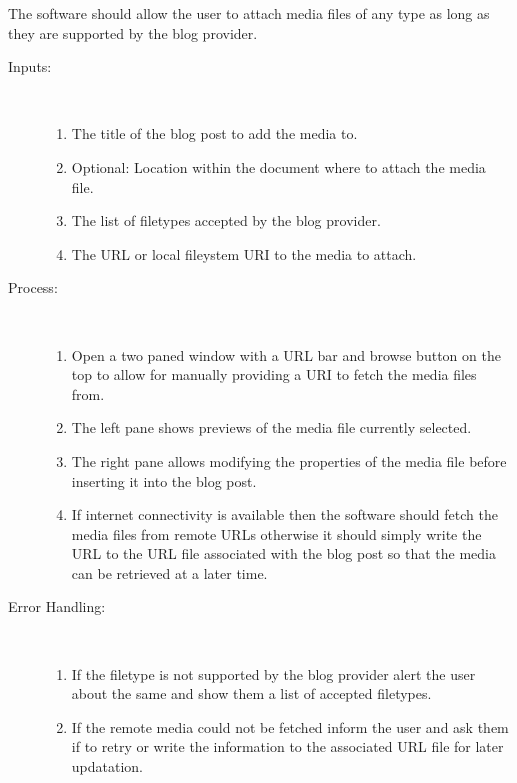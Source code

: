 
The software should allow the user to attach media files of any type as long as they are supported by the blog provider.

\begin{description}
    \item [Inputs:] ~
    \begin{enumerate}[noitemsep]
        \item {The title of the blog post to add the media to.}
        \item {Optional: Location within the document where to attach the media file.}
        \item {The list of filetypes accepted by the blog provider.}
        \item {The URL or local fileystem URI to the media to attach.}
    \end{enumerate}
    \item [Process:] ~
    \begin{enumerate}[noitemsep]
        \item {Open a two paned window with a URL bar and browse button on the top to allow for manually providing a URI
               to fetch the media files from.}
        \item {The left pane shows previews of the media file currently selected.}
        \item {The right pane allows modifying the properties of the media file before inserting it into the blog post.}
        \item {If internet connectivity is available then the software should fetch the media files from remote URLs
               otherwise it should simply write the URL to the URL file associated with the blog post so that the media
               can be retrieved at a later time.}
    \end{enumerate}
    \item [Error Handling:] ~
    \begin{enumerate}[noitemsep]
        \item {If the filetype is not supported by the blog provider alert the user about the same and show them a list
               of accepted filetypes.}
        \item {If the remote media could not be fetched inform the user and ask them if to retry or write the
               information to the associated URL file for later updatation.}
    \end{enumerate}
\end{description}

